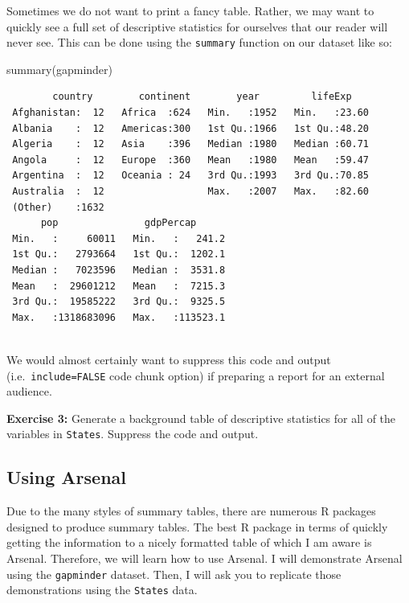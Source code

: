 \documentclass[
]{book}
\makeatletter
\newenvironment{Shaded}{\begin{snugshade}}{\end{snugshade}}
\newcommand{\FunctionTok}[1]{\textcolor[rgb]{0,0,0}{#1}}
\newcommand{\NormalTok}[1]{#1}
\newenvironment{kframe}{%
\medskip{}
\setlength{\fboxsep}{.8em}
 \def\at@end@of@kframe{}%
 \ifinner\ifhmode%
  \def\at@end@of@kframe{\end{minipage}}%
  \begin{minipage}{\columnwidth}%
 \fi\fi%
 \def\FrameCommand##1{\hskip\@totalleftmargin \hskip-\fboxsep
 \colorbox{shadecolor}{##1}\hskip-\fboxsep
     \hskip-\linewidth \hskip-\@totalleftmargin \hskip\columnwidth}%
 \MakeFramed {\advance\hsize-\width
   \@totalleftmargin\z@ \linewidth\hsize
   \@setminipage}}%
 {\par\unskip\endMakeFramed%
 \at@end@of@kframe}
\renewenvironment{Shaded}{\begin{kframe}}{\end{kframe}}
\newenvironment{rmdblock}[1]
  {\begin{shaded*}
  }
  {\end{shaded*}
  }
\newenvironment{learncheck}
  {\begin{rmdblock}{warning}}
  {\end{rmdblock}}
\makeatother
\begin{document}
Sometimes we do not want to print a fancy table. Rather, we may want to quickly see a full set of descriptive statistics for ourselves that our reader will never see. This can be done using the \texttt{summary} function on our dataset like so:

\begin{Shaded}
\begin{Highlighting}[]
\FunctionTok{summary}\NormalTok{(gapminder)}
\end{Highlighting}
\end{Shaded}

\begin{verbatim}
        country        continent        year         lifeExp     
 Afghanistan:  12   Africa  :624   Min.   :1952   Min.   :23.60  
 Albania    :  12   Americas:300   1st Qu.:1966   1st Qu.:48.20  
 Algeria    :  12   Asia    :396   Median :1980   Median :60.71  
 Angola     :  12   Europe  :360   Mean   :1980   Mean   :59.47  
 Argentina  :  12   Oceania : 24   3rd Qu.:1993   3rd Qu.:70.85  
 Australia  :  12                  Max.   :2007   Max.   :82.60  
 (Other)    :1632                                                
      pop               gdpPercap       
 Min.   :     60011   Min.   :   241.2  
 1st Qu.:   2793664   1st Qu.:  1202.1  
 Median :   7023596   Median :  3531.8  
 Mean   :  29601212   Mean   :  7215.3  
 3rd Qu.:  19585222   3rd Qu.:  9325.5  
 Max.   :1318683096   Max.   :113523.1  
                                        
\end{verbatim}

We would almost certainly want to suppress this code and output (i.e.~\texttt{include=FALSE} code chunk option) if preparing a report for an external audience.

\begin{learncheck}
\textbf{Exercise 3:} Generate a background table of descriptive
statistics for all of the variables in \texttt{States}. Suppress the
code and output.
\end{learncheck}

\hypertarget{using-arsenal}{%
\subsection{Using Arsenal}\label{using-arsenal}}

Due to the many styles of summary tables, there are numerous R packages designed to produce summary tables. The best R package in terms of quickly getting the information to a nicely formatted table of which I am aware is Arsenal. Therefore, we will learn how to use Arsenal. I will demonstrate Arsenal using the \texttt{gapminder} dataset. Then, I will ask you to replicate those demonstrations using the \texttt{States} data.
\end{document}
